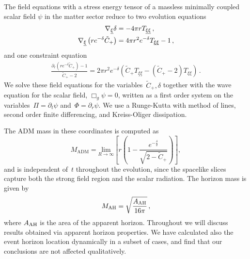 \documentclass[floats,floatfix,showpacs,amssymb,prd,twocolumn,superscriptaddress,nofootinbib,nolongbibliography,reprint]{revtex4-2}
\begin{document}
 The field equations with a stress energy tensor of a massless minimally coupled scalar field $\psi$ in the matter sector reduce to two evolution equations
\begin{align}
    \nabla_{\underline{\xi}}\delta&= -4 \pi  r T_{\underline{\xi}\underline{\xi}} \, , \\
    \nabla_{\underline{\xi}}\left(re^{-\delta}\tilde{C}_+\right)&=4 \pi  r^2e^{-\delta} T_{\text{\underbar{$\xi$}\underbar{$\xi$}}}-1 \, ,
\end{align}
and one constraint equation
\begin{align}
\label{Eq:constraint}
   \frac{\partial_r \left(re^{-\delta}\tilde{C}_+\right)-1}{\tilde{C}_+-2}=2 \pi r^2e^{-\delta} \left(\tilde{C}_+ T_{\underline{\xi}\underline{\xi}}-(\tilde{C}_+-2) T_{\xi \xi
   }\right) \, .
\end{align}
We solve these field equations for the variables~$\tilde{C}_+,\delta$ together with the wave equation for the scalar field, $\Box_g\psi=0$, written as a first order system on the variables~$\Pi=\partial_t\psi$ and~$\Phi=\partial_r\psi$. We use a Runge-Kutta with method of lines, second order finite differencing, and Kreiss-Oliger dissipation.

The ADM mass in these coordinates is computed as
\begin{equation}
M_{\textrm{ADM}}=\underset{R\to\infty}{\text{lim}}\left[r\left(1-\frac{e^{-\frac{\delta}{2}}}{\sqrt{2-\tilde{C}_+}}\right)\right] ,
\end{equation}
and is independent of~$t$ throughout the evolution, since the spacelike slices capture both the strong field region and the scalar radiation. The horizon mass is given by 
\begin{equation}
M_{\textrm{AH}}=\sqrt{\frac{A_{\rm AH}}{16\pi}} \, ,
\end{equation}
%
where $A_{\rm AH}$ is the area of the apparent horizon. Throughout we will discuss results obtained via apparent horizon properties. We have calculated also the event horizon location dynamically in a subset of cases, and find that our conclusions are not affected qualitatively.
\end{document}
